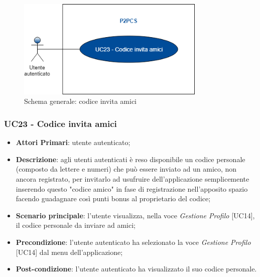\begin{figure}[h]
	\includegraphics[width=9cm]{res/images/UC23Codiceamico.png}
	\centering
	\caption{Schema generale: codice invita amici}
\end{figure}
\subsubsection{UC23 - Codice invita amici}
\begin{itemize}
	\item \textbf{Attori Primari}: utente autenticato;
	\item \textbf{Descrizione}: agli utenti autenticati è reso disponibile un codice personale (composto da lettere e numeri) che può essere inviato ad un amico, non ancora registrato, per invitarlo ad usufruire dell'applicazione semplicemente inserendo questo "codice amico" in fase di registrazione nell'apposito spazio facendo guadagnare così punti bonus al proprietario del codice;
	\item \textbf{Scenario principale}: l'utente visualizza, nella voce \textit{Gestione Profilo} [UC14], il codice personale da inviare ad amici;
	\item \textbf{Precondizione}: l'utente autenticato ha selezionato la voce \textit{Gestione Profilo} [UC14] dal menu dell'applicazione;
	\item \textbf{Post-condizione}: l'utente autenticato ha visualizzato il suo codice personale. 
\end{itemize} 
